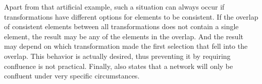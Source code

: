 Apart from that artificial example, such a situation can always occur if transformations have different options for elements to be consistent.
If the overlap of consistent elements between all transformations does not contain a single element, the result may be any of the elements in the overlap.
And the result may depend on which transformation made the first selection that fell into the overlap.
This behavior is actually desired, thus preventing it by requiring confluence is not practical.
Finally, \textcite[p.~14]{stevens2020BidirectionalTransformationLarge-SoSym} also states that a network will only be confluent under very specific circumstances.



